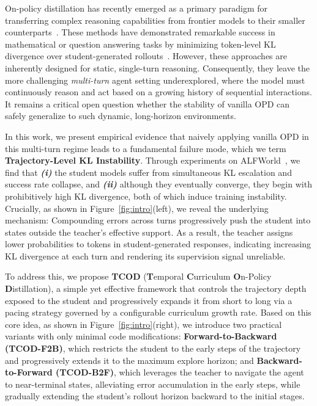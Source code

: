 \documentclass{article} %
\newcommand{\ours}{TCOD\xspace}
\begin{document}
On-policy distillation has recently emerged as a primary paradigm for transferring complex reasoning capabilities from frontier models to their smaller counterparts~\citep{agarwal2024policy,lu2025onpolicydistillation}. 
These methods have demonstrated remarkable success in mathematical or question answering tasks by minimizing token-level KL divergence over student-generated rollouts~\citep{jang2026stable, ko2026scaling,jin2026entropy}. 
However, these approaches are inherently designed for static, single-turn reasoning.
Consequently, they leave the more challenging \textit{multi-turn} agent setting underexplored, where the model must continuously reason and act based on a growing history of sequential interactions.
It remains a critical open question whether the stability of vanilla OPD can safely generalize to such dynamic, long-horizon environments.

In this work, we present empirical evidence that naively applying vanilla OPD in this multi-turn regime leads to a fundamental failure mode, which we term \textbf{Trajectory-Level KL Instability}.
Through experiments on ALFWorld~\citep{shridhar2020alfworld}, we find that \textbf{\textit{(i)}} the student models suffer from simultaneous KL escalation and success rate collapse, 
and \textbf{\textit{(ii)}} although they eventually converge, they begin with prohibitively high KL divergence, both of which induce training instability. 
Crucially, as shown in Figure~\ref{fig:intro}(left), we reveal the underlying mechanism: 
Compounding errors across turns progressively push the student into states outside the teacher’s effective support. 
As a result, the teacher assigns lower probabilities to tokens in student-generated responses, indicating increasing KL divergence at each turn and rendering its supervision signal unreliable.

To address this, we propose \textbf{\ours} (\textbf{T}emporal \textbf{C}urriculum \textbf{O}n-Policy \textbf{D}istillation), a simple yet effective framework that controls the trajectory depth exposed to the student and progressively expands it from short to long via a pacing strategy governed by a configurable curriculum growth rate.
Based on this core idea, as shown in Figure~\ref{fig:intro}(right), we introduce two practical variants with only minimal code modifications: \textbf{Forward-to-Backward (\ours-F2B)}, which restricts the student to the early steps of the trajectory and progressively extends it to the maximum explore horizon; 
and \textbf{Backward-to-Forward (\ours-B2F)}, which leverages the teacher to navigate the agent to near-terminal states, alleviating error accumulation in the early steps, while gradually extending the student's rollout horizon backward to the initial stages.
\end{document}
